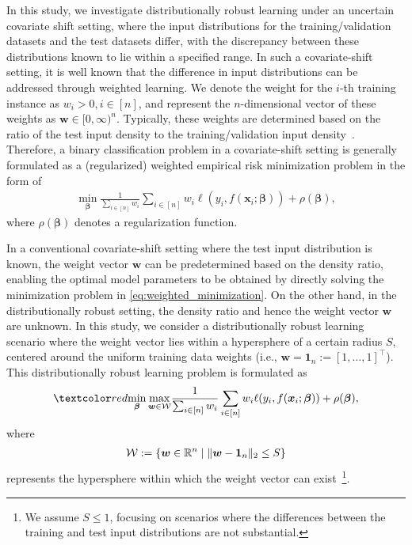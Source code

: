 In this study, we investigate distributionally robust learning under an uncertain covariate shift setting, where the input distributions for the training/validation datasets and the test datasets differ, with the discrepancy between these distributions known to lie within a specified range.
%
In such a covariate-shift setting, it is well known that the difference in input distributions can be addressed through weighted learning.  
%
We denote the weight for the $i$-th training instance as $w_i > 0, i \in [n]$, and represent the $n$-dimensional vector of these weights as $\bm{w} \in [0, \infty)^n$.  
%
Typically, these weights are determined based on the ratio of the test input density to the training/validation input density~\citep{shimodaira2000improving, sugiyama2007covariate}.  
%
Therefore, a binary classification problem in a covariate-shift setting is generally formulated as a (regularized) weighted empirical risk minimization problem in the form of  
\begin{align}  
\label{eq:weighted_minimization}  
\min_{\bm \beta} {\frac{1}{\sum_{i \in [n]} w_i}} \sum_{i \in [n]} w_i \ell(y_i, f(\bm x_i; \bm \beta)) + \rho(\bm \beta),  
\end{align}  
where $\rho(\bm \beta)$ denotes a regularization function.  

In a conventional covariate-shift setting where the test input distribution is known, the weight vector $\bm{w}$ can be predetermined based on the density ratio, enabling the optimal model parameters to be obtained by directly solving the minimization problem in \eqref{eq:weighted_minimization}.
%
On the other hand, in the distributionally robust setting, the density ratio and hence the weight vector $\bm w$ are unknown.
%
In this study, we consider a distributionally robust learning scenario where the weight vector lies within a hypersphere of a certain radius $S$, centered around the uniform training data weights (i.e., $ \bm w = \bm{1}_n := [1, \ldots, 1]^\top $).
%
This distributionally robust learning problem is formulated as  
\begin{align}  
\red{\min_{\bm{\beta}} \max_{\bm{w} \in \cW}} {\frac{1}{\sum_{i \in [n]} w_i}} \sum_{i \in [n]} w_i \ell(y_i, f(\bm{x}_i; \bm{\beta})) + \rho(\bm{\beta}),  
\end{align}  
where  
\begin{align}  
{\mathcal W} := \{\bm{w} \in \mathbb{R}^n \mid \| \bm{w} - \bm{1}_{n} \|_2 \le S\} \label{eq:weight-changes-distrib}
\end{align}  
represents the hypersphere within which the weight vector can exist~\footnote{  
We assume $S \leq 1$, focusing on scenarios where the differences between the training and test input distributions are not substantial.  
}.  


